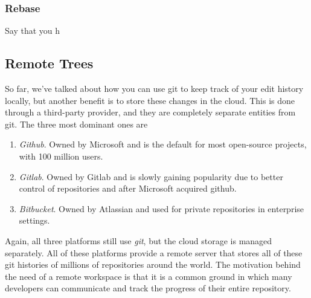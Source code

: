 \documentclass{article}
\begin{document}
      \begin{definition}
        
      \end{definition} 

      \begin{definition}
        
      \end{definition}

    \subsubsection{Rebase}

      \begin{definition}[Rebase]
        
      \end{definition}

      \begin{definition}
        Say that you h 
      \end{definition}
    
  \subsection{Remote Trees}

    So far, we've talked about how you can use git to keep track of your edit history locally, but another benefit is to store these changes in the cloud. This is done through a third-party provider, and they are completely separate entities from git. The three most dominant ones are  
    \begin{enumerate}
      \item \textit{Github}. Owned by Microsoft and is the default for most open-source projects, with 100 million users. 
      \item \textit{Gitlab}. Owned by Gitlab and is slowly gaining popularity due to better control of repositories and after Microsoft acquired github. 
      \item \textit{Bitbucket}. Owned by Atlassian and used for private repositories in enterprise settings. 
    \end{enumerate}
    Again, all three platforms still use \textit{git}, but the cloud storage is managed separately. All of these platforms provide a remote server that stores all of these git histories of millions of repositories around the world. The motivation behind the need of a remote workspace is that it is a common ground in which many developers can communicate and track the progress of their entire repository. 
\end{document}
